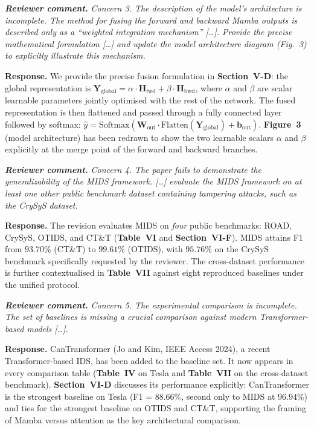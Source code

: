 \documentclass[11pt,a4paper]{article}
\newcommand{\rcomment}[1]{%
  \par\medskip
  \begingroup
  \itshape
  \textbf{Reviewer comment.}\,\,#1
  \endgroup
  \par
}
\newcommand{\rresponse}[1]{%
  \par
  \begingroup
  \color{NavyBlue}
  \textbf{Response.}\,\,#1
  \endgroup
  \par\medskip
}
\newcommand{\xref}[1]{\textbf{#1}}
\begin{document}
\rcomment{Concern 3. The description of the model's architecture
is incomplete. The method for fusing the forward and backward
Mamba outputs is described only as a ``weighted integration
mechanism'' [\dots]. Provide the precise mathematical formulation
[\dots] and update the model architecture diagram (Fig.~3) to
explicitly illustrate this mechanism.}
\rresponse{We provide the precise fusion formulation in
\xref{Section~V-D}: the global representation is
$\mathbf{Y}_{\mathrm{global}} = \alpha\cdot\mathbf{H}_{\mathrm{fwd}}
+ \beta\cdot\mathbf{H}_{\mathrm{bwd}}$, where $\alpha$ and
$\beta$ are scalar learnable parameters jointly optimised with
the rest of the network. The fused representation is then
flattened and passed through a fully connected layer followed by
softmax: $\hat{y} = \mathrm{Softmax}\!\left(\mathbf{W}_{\mathrm{out}}
\cdot\mathrm{Flatten}(\mathbf{Y}_{\mathrm{global}})
+ \mathbf{b}_{\mathrm{out}}\right)$. \xref{Figure~3} (model
architecture) has been redrawn to show the two learnable scalars
$\alpha$ and $\beta$ explicitly at the merge point of the
forward and backward branches.}

\rcomment{Concern 4. The paper fails to demonstrate the
generalizability of the MIDS framework. [\dots] evaluate the MIDS
framework on at least one other public benchmark dataset
containing tampering attacks, such as the CrySyS dataset.}
\rresponse{The revision evaluates MIDS on \emph{four} public
benchmarks: ROAD, CrySyS, OTIDS, and CT\&T (\xref{Table~VI} and
\xref{Section~VI-F}). MIDS attains F1 from $93.70\%$ (CT\&T) to
$99.61\%$ (OTIDS), with $95.76\%$ on the CrySyS benchmark
specifically requested by the reviewer. The cross-dataset
performance is further contextualised in \xref{Table~VII} against
eight reproduced baselines under the unified protocol.}

\rcomment{Concern 5. The experimental comparison is incomplete.
The set of baselines is missing a crucial comparison against
modern Transformer-based models [\dots].}
\rresponse{CanTransformer (Jo and Kim, IEEE Access 2024), a recent Transformer-based
IDS, has been added to the baseline set. It now appears in every
comparison table (\xref{Table~IV} on Tesla and \xref{Table~VII}
on the cross-dataset benchmark). \xref{Section~VI-D} discusses
its performance explicitly: CanTransformer is the strongest
baseline on Tesla (F1 = $88.66\%$, second only to MIDS at
$96.94\%$) and ties for the strongest baseline on OTIDS and
CT\&T, supporting the framing of Mamba versus attention as the
key architectural comparison.}
\end{document}
